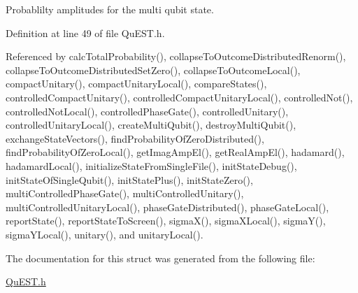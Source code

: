 Probablilty amplitudes for the multi qubit state. 

Definition at line 49 of file QuEST.h.

Referenced by calcTotalProbability(), collapseToOutcomeDistributedRenorm(), collapseToOutcomeDistributedSetZero(), collapseToOutcomeLocal(), compactUnitary(), compactUnitaryLocal(), compareStates(), controlledCompactUnitary(), controlledCompactUnitaryLocal(), controlledNot(), controlledNotLocal(), controlledPhaseGate(), controlledUnitary(), controlledUnitaryLocal(), createMultiQubit(), destroyMultiQubit(), exchangeStateVectors(), findProbabilityOfZeroDistributed(), findProbabilityOfZeroLocal(), getImagAmpEl(), getRealAmpEl(), hadamard(), hadamardLocal(), initializeStateFromSingleFile(), initStateDebug(), initStateOfSingleQubit(), initStatePlus(), initStateZero(), multiControlledPhaseGate(), multiControlledUnitary(), multiControlledUnitaryLocal(), phaseGateDistributed(), phaseGateLocal(), reportState(), reportStateToScreen(), sigmaX(), sigmaXLocal(), sigmaY(), sigmaYLocal(), unitary(), and unitaryLocal().

The documentation for this struct was generated from the following file:\begin{DoxyCompactItemize}
\item 
\hyperlink{QuEST_8h}{QuEST.h}\end{DoxyCompactItemize}
